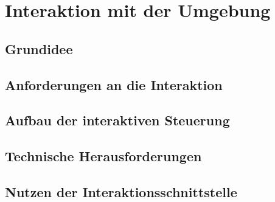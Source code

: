 \chapter{Interaktion mit der Umgebung}\label{cha:InteraktionMitDerUmgebung}

\lipsum[4]

\section{Grundidee}\label{sec:GrundideeInteraktion}

\lipsum[4]

\section{Anforderungen an die Interaktion}\label{sec:AnforderungenInteraktion}

\lipsum[4]

\section{Aufbau der interaktiven Steuerung}\label{sec:AufbauInteraktion}

\lipsum[4]

\section{Technische Herausforderungen}\label{sec:HerausforderungenInteraktion}

\lipsum[4]

\section{Nutzen der Interaktionsschnittstelle }\label{sec:NutzenInteraktion}

\lipsum[4]

